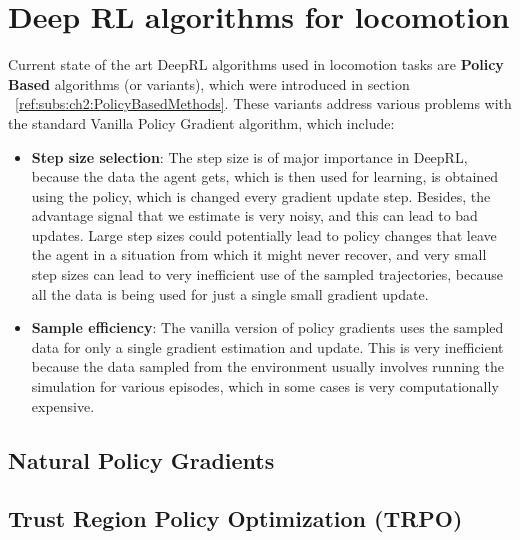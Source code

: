 \section{Deep RL algorithms for locomotion} \label{sec:ch3_deeprl_algorithms}

Current state of the art DeepRL algorithms used in locomotion tasks are \textbf{Policy Based} 
algorithms (or variants), which were introduced in section ~\ref{ref:subs:ch2:PolicyBasedMethods}. 
These variants address various problems with the standard Vanilla Policy Gradient algorithm,
which include:

\begin{itemize}
    \item \textbf{Step size selection}: The step size is of major importance in DeepRL,
          because the data the agent gets, which is then used for learning, is obtained
          using the policy, which is changed every gradient update step. Besides, the advantage
          signal that we estimate is very noisy, and this can lead to bad updates. Large
          step sizes could potentially lead to policy changes that leave the agent in
          a situation from which it might never recover, and very small step sizes
          can lead to very inefficient use of the sampled trajectories, because all
          the data is being used for just a single small gradient update.

    \item \textbf{Sample efficiency}: The vanilla version of policy gradients uses
          the sampled data for only a single gradient estimation and update. This is
          very inefficient because the data sampled from the environment usually involves
          running the simulation for various episodes, which in some cases is very 
          computationally expensive.
\end{itemize}

\subsection{Natural Policy Gradients}



\subsection{Trust Region Policy Optimization (TRPO)}


